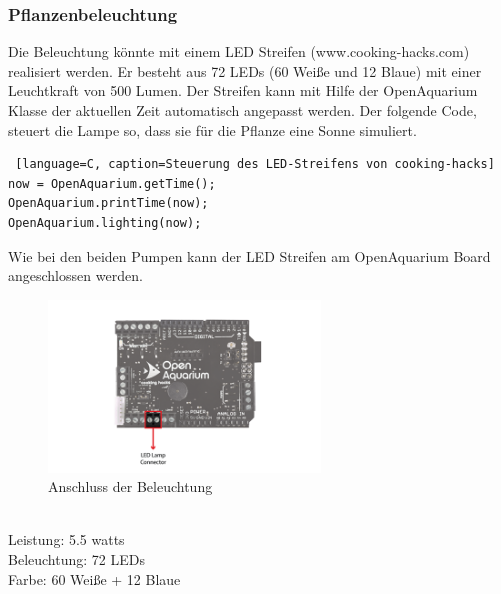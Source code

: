 \subsubsection{Pflanzenbeleuchtung}
Die Beleuchtung könnte mit einem \gls{LED} Streifen (www.cooking-hacks.com) realisiert werden. Er besteht aus 72 LEDs (60 Weiße und 12 Blaue) mit einer Leuchtkraft von 500 Lumen. Der Streifen kann mit Hilfe der OpenAquarium Klasse der aktuellen Zeit automatisch angepasst werden. Der folgende Code, steuert die Lampe so, dass sie für die Pflanze eine Sonne simuliert.
\begin{lstlisting} [language=C, caption=Steuerung des LED-Streifens von cooking-hacks]
now = OpenAquarium.getTime();
OpenAquarium.printTime(now);
OpenAquarium.lighting(now);
\end{lstlisting}
Wie bei den beiden Pumpen kann der \gls{LED} Streifen am OpenAquarium Board angeschlossen werden. \\
\begin{figure}[ht]
  \centering
    \includegraphics[height=1.8in]{images/led_connection}
    \caption{Anschluss der Beleuchtung}
\end{figure} \\
Leistung: 5.5 watts \\
Beleuchtung: 72 \gls{LED}s \\
Farbe: 60 Weiße + 12 Blaue \cite{LEDLamp}\\

